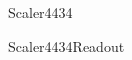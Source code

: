 \subsection{}

\begin{procdesc}{Scaler4434}{}
\end{procdesc}

\begin{procdesc}{Scaler4434Readout}{}
\end{procdesc}
